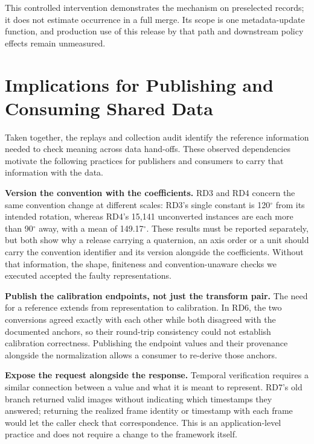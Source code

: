 \documentclass[conference]{IEEEtran}
\begin{document}
This controlled intervention demonstrates the mechanism on preselected records; it does not estimate occurrence in a full merge. Its scope is one metadata-update function, and production use of this release by that path and downstream policy effects remain unmeasured.\par

\section{Implications for Publishing and Consuming Shared Data}

Taken together, the replays and collection audit identify the reference information needed to check meaning across data hand-offs. These observed dependencies motivate the following practices for publishers and consumers to carry that information with the data.\par

\textbf{Version the convention with the coefficients.} RD3 and RD4 concern the same convention change at different scales: RD3's single constant is 120\(^{\circ}\) from its intended rotation, whereas RD4's 15,141 unconverted instances are each more than 90\(^{\circ}\) away, with a mean of 149.17\(^{\circ}\). These results must be reported separately, but both show why a release carrying a quaternion, an axis order or a unit should carry the convention identifier and its version alongside the coefficients. Without that information, the shape, finiteness and convention-unaware checks we executed accepted the faulty representations.\par

\textbf{Publish the calibration endpoints, not just the transform pair.} The need for a reference extends from representation to calibration. In RD6, the two conversions agreed exactly with each other while both disagreed with the documented anchors, so their round-trip consistency could not establish calibration correctness. Publishing the endpoint values and their provenance alongside the normalization allows a consumer to re-derive those anchors.\par

\textbf{Expose the request alongside the response.} Temporal verification requires a similar connection between a value and what it is meant to represent. RD7's old branch returned valid images without indicating which timestamps they answered; returning the realized frame identity or timestamp with each frame would let the caller check that correspondence. This is an application-level practice and does not require a change to the framework itself.\par
\end{document}
